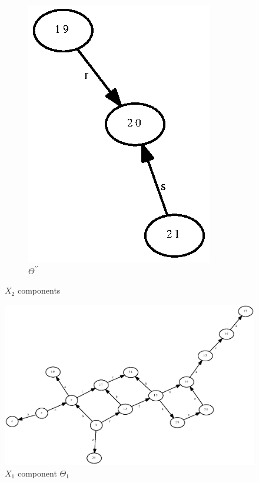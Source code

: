 \documentclass[a4paper,12pt]{article}
\numberwithin{equation}{section}
\numberwithin{figure}{section}
\begin{document}
\begin{figure}
\begin{center}
\begin{subfigure}[b]{.3\columnwidth}
\includegraphics[scale=0.5, angle=90, bb=0 0 82 210]{python/ex_K_Y2.eps}
\caption{$\Theta^{\prime\prime}$}
\label{fig:KY2}
\end{subfigure}
\end{center}
\caption{$X_2$ components}
\label{fig:KY}
\end{figure}

\begin{figure}
\begin{center}
\includegraphics[scale=0.5, bb=0 0 680 480]{python/ex_K_f1.eps}
\caption{$X_1$ component $\Theta_1$}
\label{fig:K_f1}
\end{center}
\end{figure}
\end{document}
